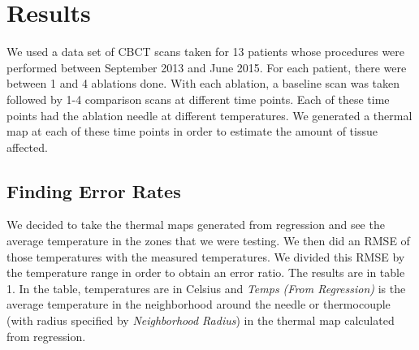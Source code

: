 \documentclass[]{spie}  %
\begin{document}
\section{Results}

We used a data set of CBCT scans taken for 13 patients whose procedures were performed between September 2013 and June 2015. For each patient, there were between 1 and 4 ablations done. With each ablation, a baseline scan was taken followed by 1-4 comparison scans at different time points. Each of these time points had the ablation needle at different temperatures. We generated a thermal map at each of these time points in order to estimate the amount of tissue affected. 

\subsection{Finding Error Rates}

We decided to take the thermal maps generated from regression and see the average temperature in the zones that we were testing. We then did an RMSE of those temperatures with the measured temperatures. We divided this RMSE by the temperature range in order to obtain an error ratio. The results are in table 1. In the table, temperatures are in Celsius and \textit{Temps (From Regression)} is the average temperature in the neighborhood around the needle or thermocouple (with radius specified by \textit{Neighborhood Radius}) in the thermal map calculated from regression. 
\end{document}
